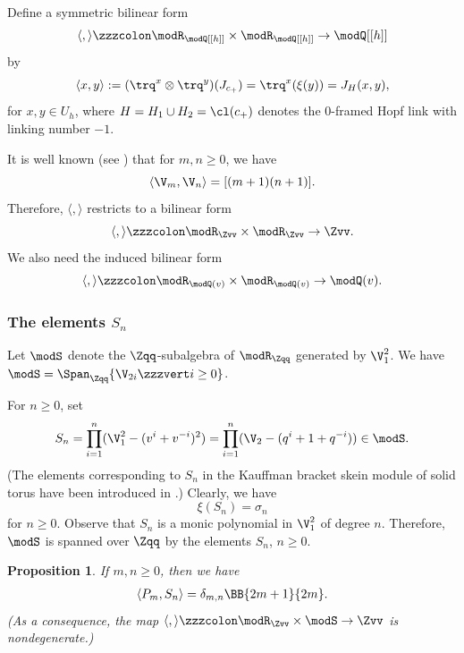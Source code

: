 \documentclass{amsart}
\numberwithin{equation}{section}
\numberwithin{figure}{section}
\theoremstyle{plain}
\newtheorem{proposition}[theorem]{Proposition}
\theoremstyle{definition}
\theoremstyle{remark}
\begin{document}
Define a symmetric bilinear form
\begin{equation*}
  \langle ,\rangle \zzzcolon \modR _{\modQ [[h]]}\times \modR _{\modQ [[h]]}\rightarrow \modQ [[h]]
\end{equation*}
by
\begin{equation}
  \label{eq:85}
  \langle x,y\rangle :=(\trq^x\otimes \trq^y)(J_{c_+})= \trq^x(\xi (y)) = J_H(x,y),
\end{equation}
for $x,y\in U_h$, where $H=H_1\cup H_2=\cl(c_+)$ denotes the $0$-framed
Hopf link with linking number $-1$.

It is well known (see
\cite{Reshetikhin-Turaev:invariants,Kirby-Melvin}) that for $m,n\ge 0$,
we have
\begin{equation*}
  \langle \V_m, \V_n\rangle  = [(m+1)(n+1)].
\end{equation*}
Therefore, $\langle ,\rangle $ restricts to a bilinear form
\begin{equation*}
  \langle ,\rangle \zzzcolon \modR _{\Zvv}\times \modR _{\Zvv}\rightarrow \Zvv.
\end{equation*}
We also need the induced bilinear form
\begin{equation*}
  \langle ,\rangle \zzzcolon \modR _{\modQ (v)}\times \modR _{\modQ (v)}\rightarrow \modQ (v).
\end{equation*}

\subsubsection{The elements $S_n$}
\label{sec:elements-checkn}

Let $\modS $ denote the $\Zqq$-subalgebra of $\modR _{\Zqq}$ generated by
$\V_1^2$.  We have $\modS =\Span_{\Zqq}\{\V_{2i}\zzzvert i\ge 0\}$.

For $n\ge 0$, set
\begin{equation*}
  S_n
  =\prod_{i=1}^{n}(\V_1^2-(v^i+v^{-i})^2)
  =\prod_{i=1}^{n}(\V_2-(q^i+1+q^{-i}))
  \in \modS .
\end{equation*}
(The elements corresponding to $S_n$ in the Kauffman bracket skein
module of solid torus have been introduced in \cite{H:iias2000}.)
Clearly, we have
\begin{equation}
  \label{e90}
  \xi (S_n)=\sigma _n
\end{equation}
for $n\ge 0$.  Observe that $S_n$ is a monic polynomial in $\V_1^2$ of
degree $n$.  Therefore, $\modS $ is spanned over $\Zqq$ by the elements
$S_n$, $n\ge 0$.

\begin{proposition}
  \label{r23}
  If $m,n\ge 0$, then we have
  \begin{gather}
    \label{e21} \langle P_m, S_n\rangle  = \delta _{m,n}\BB{2m+1}{2m}.
  \end{gather}
  (As a consequence, the map $\langle ,\rangle \zzzcolon \modR _{\Zvv}\times \modS \rightarrow \Zvv$ is nondegenerate.)
\end{proposition}
\end{document}
